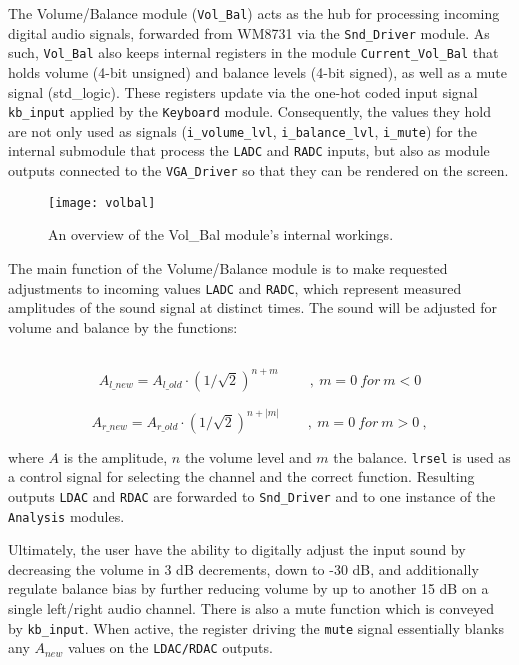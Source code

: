 The Volume/Balance module (\verb=Vol_Bal=) acts as the hub for processing incoming digital audio signals, forwarded from WM8731 via the \verb=Snd_Driver= module. As such, \verb=Vol_Bal= also keeps internal registers in the module \verb=Current_Vol_Bal= that holds volume (4-bit unsigned) and balance levels (4-bit signed), as well as a mute signal (std\_logic). These registers update via the one-hot coded input signal \verb=kb_input= applied by the \verb=Keyboard= module. Consequently, the values they hold are not only used as signals (\verb=i_volume_lvl=, \verb=i_balance_lvl=, \verb=i_mute=) for the internal submodule that process the \verb=LADC= and \verb=RADC= inputs, but also as module outputs connected to the \verb=VGA_Driver= so that they can be rendered on the screen.

\begin{figure}[h]
  \centering
  \texttt{[image: volbal]}
  \caption{An overview of the Vol\_Bal module's internal workings.}
  \label{fig:vol_bal}
\end{figure}

The main function of the Volume/Balance module is to make requested adjustments to incoming values \verb=LADC= and \verb=RADC=, which represent measured amplitudes of the sound signal at distinct times. The sound will be adjusted for volume and balance by the functions:

\verb=   =$$A_{l\_new} = A_{l\_old} \cdot (1/\sqrt{2})^{n + m}\qquad\ ,\ m = 0\ for\ m < 0$$
\verb=   =$$A_{r\_new} = A_{r\_old} \cdot (1/\sqrt{2})^{n + |m|}\qquad,\ m = 0\ for\ m > 0\ ,$$

where $A$ is the amplitude, $n$ the volume level and $m$ the balance. \verb=lrsel= is used as a control signal for selecting the channel and the correct function. Resulting outputs \verb=LDAC= and \verb=RDAC= are forwarded to \verb=Snd_Driver= and to one instance of the \verb=Analysis= modules.

Ultimately, the user have the ability to digitally adjust the input sound by decreasing the volume in 3 dB decrements, down to -30 dB, and additionally regulate balance bias by further reducing volume by up to another 15 dB on a single left/right audio channel. There is also a mute function which is conveyed by \verb=kb_input=. When active, the register driving the \verb=mute= signal essentially blanks any $A_{new}$ values on the \verb=LDAC/RDAC= outputs.


